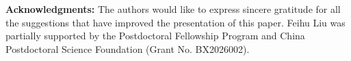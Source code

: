 \documentclass[reqno, 12pt]{article}
\numberwithin{equation}{section}
\theoremstyle{definition}
\begin{document}






\noindent
{\small \textbf{Acknowledgments:}}
The authors would like to express sincere gratitude for all the suggestions that have improved the presentation of this paper.
Feihu Liu was partially supported by the Postdoctoral Fellowship Program and China Postdoctoral Science Foundation (Grant No. BX2026002).



%
\end{document}

